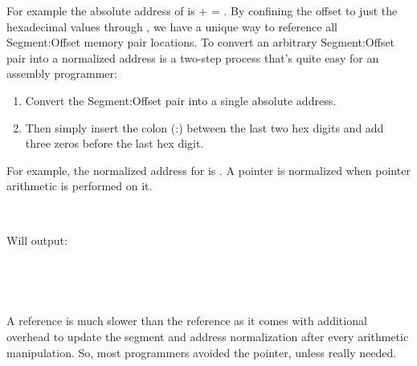 \documentclass[book.tex]{subfiles}
\begin{document}
\par
For example the absolute address of  is  +  = . By confining the offset to just the hexadecimal values  through , we have a unique way to reference all Segment:Offset memory pair locations. To convert an arbitrary Segment:Offset pair into a normalized address is a two-step process that's quite easy for an assembly programmer:\\

\begin{enumerate}
  \item Convert the Segment:Offset pair into a single absolute address.
  \item Then simply insert the colon (:) between the last two hex digits and add three zeros before the last hex digit.
\end{enumerate}

For example, the normalized address for  is . A  pointer is normalized when pointer arithmetic is performed on it. \\
\par
\begin{minipage}{\textwidth}
 \par
 \end{minipage}\\
\par
Will output:\\
\par
\begin{minipage}{\textwidth}
 \par
 \end{minipage}\\
\par



\\

\par
A  reference is much slower than the  reference as it comes with additional overhead to update the segment and address normalization after every arithmetic manipulation. So, most programmers avoided the  pointer, unless really needed.\\
\end{document}
